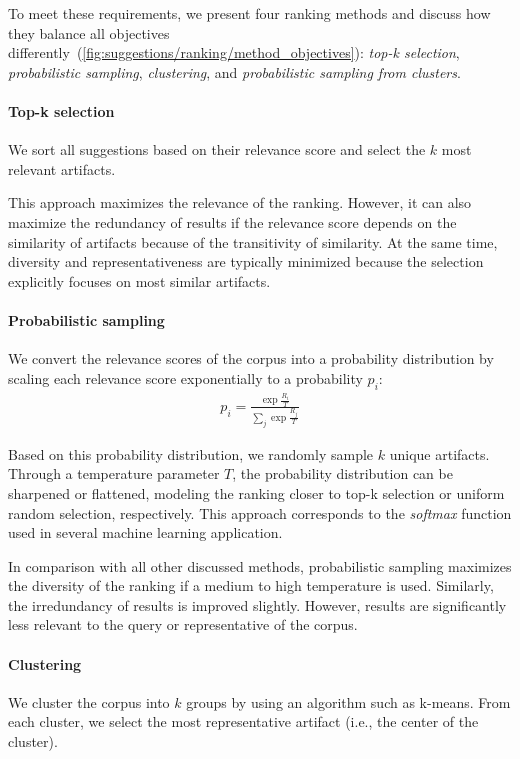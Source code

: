 To meet these requirements, we present four ranking methods and discuss how they balance all objectives differently~(\cref{fig:suggestions/ranking/method_objectives}): \emph{top-k selection}, \emph{probabilistic sampling}, \emph{clustering}, and \emph{probabilistic sampling from clusters}.

\paragraph{Top-k selection}
We sort all suggestions based on their relevance score and select the $k$ most relevant artifacts.

This approach maximizes the relevance of the ranking.
However, it can also maximize the redundancy of results if the relevance score depends on the similarity of artifacts because of the transitivity of similarity.
At the same time, diversity and representativeness are typically minimized because the selection explicitly focuses on most similar artifacts.

\paragraph{Probabilistic sampling}
We convert the relevance scores of the corpus into a probability distribution by scaling each relevance score exponentially to a probability $p_i$:
\begin{align}
	p_i = \frac{\exp \frac{R_i}{T}}{\sum_j \exp \frac{R_j}{T}}
\end{align}

Based on this probability distribution, we randomly sample $k$ unique artifacts.
Through a temperature parameter $T$, the probability distribution can be sharpened or flattened, modeling the ranking closer to top-k selection or uniform random selection, respectively.
This approach corresponds to the \emph{softmax} function used in several machine learning application.

In comparison with all other discussed methods, probabilistic sampling maximizes the diversity of the ranking if a medium to high temperature is used.
Similarly, the irredundancy of results is improved slightly.
However, results are significantly less relevant to the query or representative of the corpus.

\paragraph{Clustering}
We cluster the corpus into $k$ groups by using an algorithm such as k-means.
From each cluster, we select the most representative artifact (i.e., the center of the cluster).


